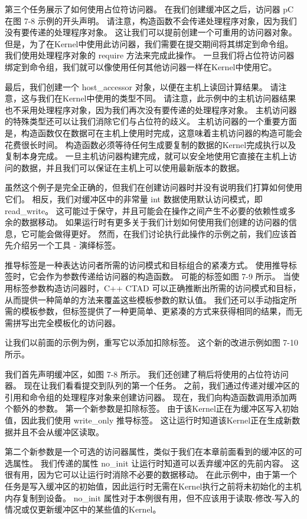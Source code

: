 第三个任务展示了如何使用占位符访问器。 在我们创建缓冲区之后，访问器 pC 在图 7-8 示例的开头声明。 
请注意，构造函数不会传递处理程序对象，因为我们没有要传递的处理程序对象。 
这让我们可以提前创建一个可重用的访问器对象。 但是，为了在Kernel中使用此访问器，我们需要在提交期间将其绑定到命令组。 
我们使用处理程序对象的 require 方法来完成此操作。 
一旦我们将占位符访问器绑定到命令组，我们就可以像使用任何其他访问器一样在Kernel中使用它。

最后，我们创建一个 host\_accessor 对象，以便在主机上读回计算结果。 
请注意，这与我们在Kernel中使用的类型不同。 
请注意，此示例中的主机访问器结果也不采用处理程序对象，因为我们再次没有要传递的处理程序对象。 
主机访问器的特殊类型还可以让我们消除它们与占位符的歧义。 
主机访问器的一个重要方面是，构造函数仅在数据可在主机上使用时完成，这意味着主机访问器的构造可能会花费很长时间。 
构造函数必须等待任何生成要复制的数据的Kernel完成执行以及复制本身完成。 
一旦主机访问器构建完成，就可以安全地使用它直接在主机上访问的数据，并且我们可以保证在主机上可以使用最新版本的数据。

虽然这个例子是完全正确的，但我们在创建访问器时并没有说明我们打算如何使用它们。 
相反，我们对缓冲区中的非常量 int 数据使用默认访问模式，即 read\_write。 
这可能过于保守，并且可能会在操作之间产生不必要的依赖性或多余的数据移动。 
如果运行时有更多关于我们计划如何使用我们创建的访问器的信息，它可能会做得更好。 
然而，在我们讨论执行此操作的示例之前，我们应该首先介绍另一个工具 - 演绎标签。

推导标签是一种表达访问者所需的访问模式和目标组合的紧凑方式。 
使用推导标签时，它会作为参数传递给访问器的构造函数。 
可能的标签如图 7-9 所示。 当使用标签参数构造访问器时，C++ CTAD 可以正确推断出所需的访问模式和目标，
从而提供一种简单的方法来覆盖这些模板参数的默认值。 
我们还可以手动指定所需的模板参数，但标签提供了一种更简单、更紧凑的方式来获得相同的结果，而无需拼写出完全模板化的访问器。

让我们以前面的示例为例，重写它以添加扣除标签。 这个新的改进示例如图 7-10 所示。

我们首先声明缓冲区，如图 7-8 所示。 我们还创建了稍后将使用的占位符访问器。 
现在让我们看看提交到队列的第一个任务。 之前，我们通过传递对缓冲区的引用和命令组的处理程序对象来创建访问器。 
现在，我们向构造函数调用添加两个额外的参数。 第一个新参数是扣除标签。 
由于该Kernel正在为缓冲区写入初始值，因此我们使用 write\_only 推导标签。 
这让运行时知道该Kernel正在生成新数据并且不会从缓冲区读取。

第二个新参数是一个可选的访问器属性，类似于我们在本章前面看到的缓冲区的可选属性。 
我们传递的属性 no\_init 让运行时知道可以丢弃缓冲区的先前内容。 这很有用，因为它可以让运行时消除不必要的数据移动。 
在此示例中，由于第一个任务是写入缓冲区的初始值，因此运行时无需在Kernel执行之前将未初始化的主机内存复制到设备。 
no\_init 属性对于本例很有用，但不应该用于读取-修改-写入的情况或仅更新缓冲区中的某些值的Kernel。

